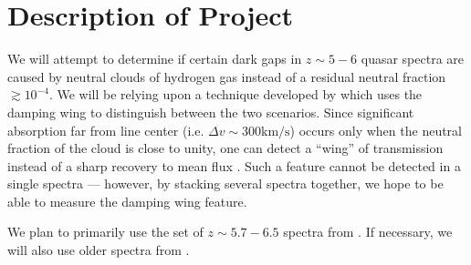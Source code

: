 \documentclass[11pt,letterpaper]{article}
\begin{document}
\section{Description of Project}
We will attempt to determine if certain dark gaps in $z\sim5-6$ quasar spectra
are caused by neutral clouds of hydrogen gas instead of a residual neutral
fraction $\gtrsim 10^{-4}$. We will be relying upon a technique developed by
\citet{2015ApJ...799..179M} which uses the damping wing to distinguish between
the two scenarios. Since significant absorption far from line center (i.e.
$\Delta v \sim 300 \text{km}/\text{s}$) occurs only when the neutral fraction
of the cloud is close to unity, one can detect a ``wing'' of transmission
instead of a sharp recovery to mean flux
\citep[Figure~4][]{2015ApJ...799..179M}. Such a feature cannot be detected in
a single spectra --- however, by stacking several spectra together, we hope to
be able to measure the damping wing feature.

We plan to primarily use the set of $z\sim5.7-6.5$ spectra from
\citet{2018ApJ...864...53E}. If necessary, we will also use older spectra from
\citet{2006AJ....132..117F}.


\end{document}
